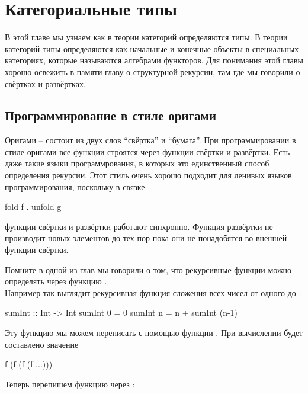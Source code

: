 \chapter{Категориальные типы}

В этой главе мы узнаем как в теории категорий определяются типы. В
теории категорий типы определяются как начальные и конечные объекты в
специальных категориях, которые называются алгебрами функторов. Для
понимания этой главы хорошо освежить в памяти главу о структурной
рекурсии, там где мы говорили о свёртках и развёртках.

\section{Программирование в стиле оригами}

Оригами -- состоит из двух слов ``свёртка'' и ``бумага''. При
программировании в стиле оригами все функции строятся через функции
свёртки и развёртки. Есть даже такие языки программрования, в которых
это единственный способ определения рекурсии. Этот стиль очень хорошо
подходит для ленивых языков программирования, поскольку в связке:


\begin{code}
fold f . unfold g
\end{code}

\noindent 

функции свёртки и развёртки работают синхронно. Функция развёртки не
производит новых элементов до тех пор пока они не понадобятся во внешней
функции свёртки.

Помните в одной из глав мы говорили о том, что рекурсивные функции можно
определять через функцию .\\Например так выглядит рекурсивная
функция сложения всех чисел от одного до :


\begin{code}
sumInt :: Int -> Int
sumInt 0 = 0
sumInt n = n + sumInt (n-1)
\end{code}

Эту функцию мы можем переписать с помощью функции . При
вычислении  будет составлено значение


\begin{code}
f (f (f (f ...)))
\end{code}

Теперь перепишем функцию  через :



